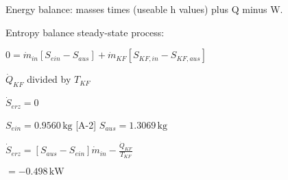 Energy balance:  
masses times (useable h values) plus Q minus W.

Entropy balance steady-state process:  

\( 0 = \dot{m}_{in} \left[ S_{ein} - S_{aus} \right] + \dot{m}_{KF} \left[ S_{KF,in} - S_{KF,aus} \right] \)  

\( \dot{Q}_{KF} \) divided by \( T_{KF} \)  

\( \dot{S}_{erz} = 0 \)  

\( S_{ein} = 0.9560 \, \text{kg} \) [A-2]  
\( S_{aus} = 1.3069 \, \text{kg} \)  

\( \dot{S}_{erz} = \left[ S_{aus} - S_{ein} \right] \dot{m}_{in} - \frac{\dot{Q}_{KF}}{T_{KF}} \)  

\( = -0.498 \, \text{kW} \)